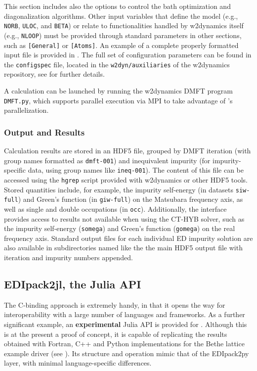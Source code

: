 \documentclass[edipack_sp.tex]{subfiles}
\begin{document}
This section includes also the options to control the bath optimization and  diagonalization algorithms. Other input variables that define the model (e.g., {\tt NORB}, {\tt ULOC}, and {\tt BETA}) or relate to functionalities handled by 
w2dynamics itself (e.g., \texttt{NLOOP}) must be provided through 
standard parameters in other sections, such as \texttt{[General]} or 
\texttt{[Atoms]}. An example of a complete properly formatted input file is provided in .
The full set of configuration parameters can be found in the {\tt configspec} file, located in the {\tt w2dyn/auxiliaries} of the w2dynamics repository, see  \cite{Wallerberger2019CPC} for further details.

A calculation can be launched by running the w2dynamics DMFT program 
\texttt{DMFT.py}, which supports parallel execution via MPI to take 
advantage of \NAME's parallelization.

\subsubsection{Output and Results}\label{sSecInteropw2dyNOutput}
Calculation results are stored in an HDF5 file, grouped by DMFT iteration (with group names formatted as {\tt dmft-001}) and inequivalent impurity (for impurity-specific data, using group names like 
\texttt{ineq-001}). 
The content of this file can be accessed using the 
\texttt{hgrep} script provided with w2dynamics or other HDF5 tools. 
Stored quantities include, for example, the impurity self-energy (in 
datasets \texttt{siw-full}) and Green's function (in 
\texttt{giw-full}) on the Matsubara frequency axis, as well as single 
and double occupations (in \texttt{occ}). Additionally, the interface 
provides access to results not available when using the CT-HYB solver, 
such as the impurity self-energy (\texttt{somega}) and Green's function 
(\texttt{gomega}) on the real frequency axis.
Standard \NAME output files for each individual ED impurity solution are also available in subdirectories named like the the main HDF5 output file with iteration and impurity numbers appended.






\subsection{EDIpack2jl, the Julia API}\label{sSecInteropEDIjl}
The C-binding approach is extremely handy, in that it opens the way for interoperability  with a large number of languages and frameworks. 
As a further significant example, an {\bf experimental} Julia API 
is provided for \NAME. Although this is at the present a proof of concept, it is capable of replicating the results obtained with Fortran, C++ and
Python implementations for the Bethe lattice example driver (see ).
Its structure and operation mimic that of the EDIpack2py layer, with minimal language-specific differences.
\end{document}
